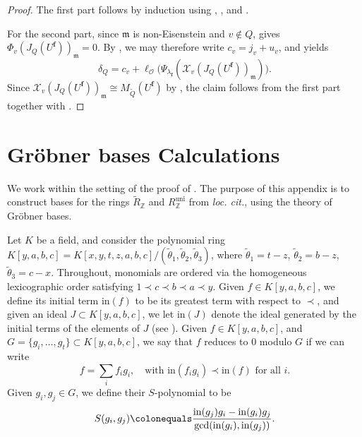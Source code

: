 \documentclass[a4paper, notitlepage, 10pt]{amsart}
\theoremstyle{plain} %
\theoremstyle{definition} %
\theoremstyle{remark} %
\numberwithin{equation}{section}
\newcommand{\uni}{\operatorname{uni}}
\begin{document}
\begin{proof}
    The first part follows by induction using , , and .
    
     For the second part, since $\mathfrak{m}$ is non-Eisenstein and $v\not\in Q$, \cite[Proposition 5]{Raj01} gives $\Phi_v(J_{Q}(U^{\mathbf{f}}))_{\mathfrak{m}}=0$. By , we may therefore write $c_v=j_v+u_v$, and   yields $$\delta_Q=c_v+ \ell_{\mathcal{O}}\big(\Psi_{\lambda_{\mathbf{f}}}(\mathcal{X}_v(J_Q(U^{\mathbf{f}}))_{\mathfrak{m}})\big).$$ Since $\mathcal{X}_v(J_Q(U^{\mathbf{f}}))_{\mathfrak{m}}\cong M_{\widetilde{Q}}(U^{\mathbf{f}})$ by , the claim follows from the first part together with .
\end{proof}

\appendix
\section{Gröbner bases Calculations}\label{appendixA}

We work within the setting of the proof of . The purpose of this appendix is to construct bases for the rings $\widetilde{R}_{\mathbb{Z}}$ and $R^{\uni}_{\mathbb{Z}}$ from \emph{loc. cit.}, using the theory of Gröbner bases.

Let $K$ be a field, and consider the polynomial ring $K[y,a,b,c]=K[x,y,t,z,a,b,c]/(\widetilde{\theta}_1,\widetilde{\theta}_2,\widetilde{\theta}_3)$, where $\widetilde{\theta}_1=t-z$, $\widetilde{\theta}_2=b-z$, $\widetilde{\theta}_3=c-x$. Throughout, monomials are ordered via the homogeneous lexicographic order satisfying $1\prec c \prec b \prec a \prec y$. Given $f\in K[y,a,b,c]$, we define its initial term $\mathrm{in}(f)$ to be its greatest term with respect to $\prec$, and given an ideal $J\subset K[y,a,b,c]$, we let $\mathrm{in}(J)$ denote the ideal generated by the initial terms of the elements of $J$ (see \cite[\S 15]{Eisen}). Given $f\in K[y,a,b,c]$, and $G=\{g_i,\dots,g_t\}\subset K[y,a,b,c] $, we say that $f$ reduces to $0$ modulo $G$ if we can write
$$ f=\sum_i f_i g_i, \quad \text{with }\mathrm{in}(f_ig_i)\prec \mathrm{in}(f)\text{ for all }i. $$
 Given $g_i,g_j\in G$, we define their $S$-polynomial to be
$$ S(g_i,g_j)\colonequals \frac{\mathrm{in}(g_j)g_i-\mathrm{in}(g_i)g_j}{\gcd(\mathrm{in}(g_i),\mathrm{in}(g_j))}.  $$
\end{document}
